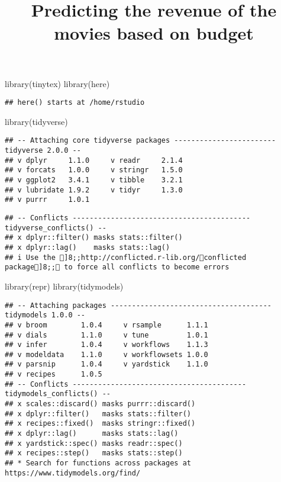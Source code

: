 \documentclass[
]{article}
\title{Predicting the revenue of the movies based on budget}
\author{}
\date{\vspace{-2.5em}}
\newenvironment{Shaded}{\begin{snugshade}}{\end{snugshade}}
\newcommand{\FunctionTok}[1]{\textcolor[rgb]{0.00,0.00,0.00}{#1}}
\newcommand{\NormalTok}[1]{#1}
\begin{document}
\maketitle

{
\setcounter{tocdepth}{2}
\tableofcontents
}
\begin{Shaded}
\begin{Highlighting}[]
\FunctionTok{library}\NormalTok{(tinytex)}
\FunctionTok{library}\NormalTok{(here)}
\end{Highlighting}
\end{Shaded}

\begin{verbatim}
## here() starts at /home/rstudio
\end{verbatim}

\begin{Shaded}
\begin{Highlighting}[]
\FunctionTok{library}\NormalTok{(tidyverse)}
\end{Highlighting}
\end{Shaded}

\begin{verbatim}
## -- Attaching core tidyverse packages ------------------------ tidyverse 2.0.0 --
## v dplyr     1.1.0     v readr     2.1.4
## v forcats   1.0.0     v stringr   1.5.0
## v ggplot2   3.4.1     v tibble    3.2.1
## v lubridate 1.9.2     v tidyr     1.3.0
## v purrr     1.0.1
\end{verbatim}

\begin{verbatim}
## -- Conflicts ------------------------------------------ tidyverse_conflicts() --
## x dplyr::filter() masks stats::filter()
## x dplyr::lag()    masks stats::lag()
## i Use the ]8;;http://conflicted.r-lib.org/conflicted package]8;; to force all conflicts to become errors
\end{verbatim}

\begin{Shaded}
\begin{Highlighting}[]
\FunctionTok{library}\NormalTok{(repr)}
\FunctionTok{library}\NormalTok{(tidymodels)}
\end{Highlighting}
\end{Shaded}

\begin{verbatim}
## -- Attaching packages -------------------------------------- tidymodels 1.0.0 --
## v broom        1.0.4     v rsample      1.1.1
## v dials        1.1.0     v tune         1.0.1
## v infer        1.0.4     v workflows    1.1.3
## v modeldata    1.1.0     v workflowsets 1.0.0
## v parsnip      1.0.4     v yardstick    1.1.0
## v recipes      1.0.5     
## -- Conflicts ----------------------------------------- tidymodels_conflicts() --
## x scales::discard() masks purrr::discard()
## x dplyr::filter()   masks stats::filter()
## x recipes::fixed()  masks stringr::fixed()
## x dplyr::lag()      masks stats::lag()
## x yardstick::spec() masks readr::spec()
## x recipes::step()   masks stats::step()
## * Search for functions across packages at https://www.tidymodels.org/find/
\end{verbatim}
\end{document}
